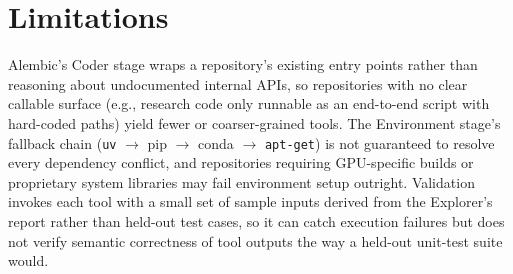 \section*{Limitations}
Alembic's Coder stage wraps a repository's existing entry points rather than reasoning about undocumented internal APIs, so repositories with no clear callable surface (e.g., research code only runnable as an end-to-end script with hard-coded paths) yield fewer or coarser-grained tools. The Environment stage's fallback chain (\texttt{uv} $\to$ pip $\to$ conda $\to$ \texttt{apt-get}) is not guaranteed to resolve every dependency conflict, and repositories requiring GPU-specific builds or proprietary system libraries may fail environment setup outright. Validation invokes each tool with a small set of sample inputs derived from the Explorer's report rather than held-out test cases, so it can catch execution failures but does not verify semantic correctness of tool outputs the way a held-out unit-test suite would.
